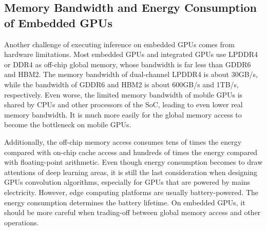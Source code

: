 \documentclass{article}
\begin{document}








\subsection{Memory Bandwidth and Energy Consumption of Embedded GPUs}
Another challenge of executing inference on embedded GPUs comes from hardware limitations. Most embedded GPUs and integrated GPUs use LPDDR4 or DDR4 as off-chip global memory, whose bandwidth is far less than GDDR6 and HBM2. The memory bandwidth of dual-channel LPDDR4 is about 30GB/s, while the bandwidth of GDDR6 and HBM2 is about 600GB/s and 1TB/s, respectively. Even worse, the limited memory bandwidth of mobile GPUs is shared by CPUs and other processors of the SoC, leading to even lower real memory bandwidth. It is much more easily for the global memory access to become the bottleneck on mobile GPUs. 

Additionally, the off-chip memory access consumes tens of times the energy compared with on-chip cache access and hundreds of times the energy compared with floating-point arithmetic. Even though energy consumption becomes to draw attentions of deep learning areas, it is still the last consideration when designing GPUs convolution algorithms, especially for GPUs that are powered by mains electricity. However, edge computing platforms are usually battery-powered. The energy consumption determines the battery lifetime. On embedded GPUs, it should be more careful when trading-off between global memory access and other operations.

\end{document}

